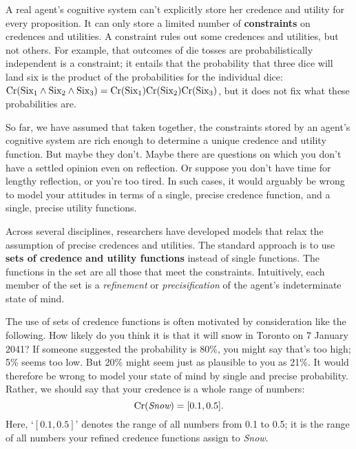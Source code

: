 A real agent's cognitive system can't explicitly store her credence and
utility for every proposition. It can only store a limited number of
\textbf{constraints} on credences and utilities. A constraint rules
out some credences and utilities, but not others. For example, that
outcomes of die tosses are probabilistically independent is a
constraint; it entails that the probability that three dice will land
six is the product of the probabilities for the individual dice:
$\text{Cr}(\text{Six}_1 \land \text{Six}_2 \land \text{Six}_3) =
\text{Cr}(\text{Six}_1)\text{Cr}(\text{Six}_2)\text{Cr}(\text{Six}_3)$, but it does not
fix what these probabilities are.

So far, we have assumed that taken together, the constraints stored by
an agent's cognitive system are rich enough to determine a unique
credence and utility function. But maybe they don't.  Maybe there are
questions on which you don't have a settled opinion even on
reflection. Or suppose you don't have time for lengthy reflection, or
you're too tired.  In such cases, it would arguably be wrong to model
your attitudes in terms of a single, precise credence function, and a
single, precise utility functions.

Across several disciplines, researchers have developed models that
relax the assumption of precise credences and utilities. The standard
approach is to use \textbf{sets of credence and utility functions}
instead of single functions. The functions in the set are all those
that meet the constraints. Intuitively, each member of the set is a
\emph{refinement} or \emph{precisification} of the agent's
indeterminate state of mind.

The use of sets of credence functions is often motivated by
consideration like the following. How likely do you think it is that
it will snow in Toronto on 7 January 2041? If someone suggested the
probability is 80\%, you might say that's too high; 5\% seems too
low. But 20\% might seem just as plausible to you as 21\%. It would
therefore be wrong to model your state of mind by single and precise
probability. Rather, we should say that your credence is a whole range
of numbers:
\[
\text{Cr}(\emph{Snow}) = [0.1, 0.5].
\]
Here, `$[0.1, 0.5]$' denotes the range of all numbers from 0.1 to 0.5;
it is the range of all numbers your refined credence functions assign
to \emph{Snow}.


